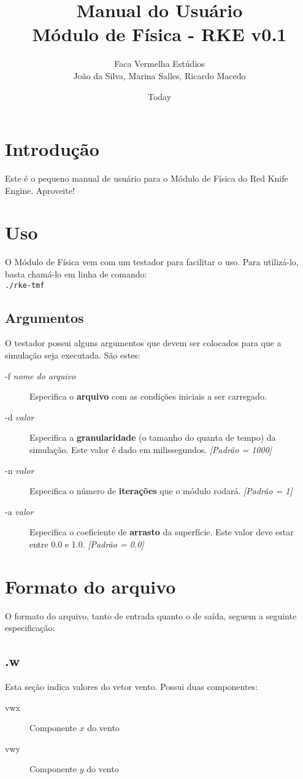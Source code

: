 \documentclass[]{paper}
\begin{document}
\title{Manual do Usuário \\ Módulo de Física - RKE v0.1}
\author{Faca Vermelha Estúdios\\João da Silva, Marina Salles, Ricardo Macedo}
\date{Today}
\maketitle

\section{Introdução}
Este é o pequeno manual de usuário para o Módulo de Física do Red Knife Engine. Aproveite!
\section{Uso}
O Módulo de Física vem com um testador para facilitar o uso. Para utilizá-lo, basta chamá-lo em linha de comando:
\\

\texttt{./rke-tmf}

\subsection{Argumentos}
O testador possui alguns argumentos que devem ser colocados para que a simulação seja executada. São estes:
\begin{description}
\item[-f \emph{nome do arquivo}] Especifica o \textbf{arquivo} com as condições iniciais a ser carregado.
\item[-d \emph{valor}] Especifica a \textbf{granularidade} (o tamanho do quanta de tempo) da simulação. Este valor é dado em milissegundos. \emph{[Padrão = 1000]}
\item[-n \emph{valor}] Especifica o número de \textbf{iterações} que o módulo rodará. \emph{[Padrão = 1]}
\item[-a \emph{valor}] Especifica o coeficiente de \textbf{arrasto} da superfície. Este valor deve estar entre 0.0 e 1.0. \emph{[Padrão = 0.0]}
\end{description}

\section{Formato do arquivo}
O formato do arquivo, tanto de entrada quanto o de saída, seguem a seguinte especificação:

\subsection{.w}
Esta seção indica valores do vetor vento. Possui duas componentes:
\begin{description}
\item[vwx] Componente $x$ do vento
\item[vwy] Componente $y$ do vento
\end{description}
\end{document}
